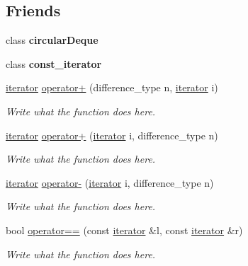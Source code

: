 \subsection*{Friends}
\begin{DoxyCompactItemize}
\item 
\hypertarget{classcircularDeque_1_1iterator_aa63d8b47e75b076d05ec6aa14e29109b}{class {\bfseries circular\+Deque}}\label{classcircularDeque_1_1iterator_aa63d8b47e75b076d05ec6aa14e29109b}

\item 
\hypertarget{classcircularDeque_1_1iterator_ac220ce1c155db1ac44146c12d178056f}{class {\bfseries const\+\_\+iterator}}\label{classcircularDeque_1_1iterator_ac220ce1c155db1ac44146c12d178056f}

\item 
\hyperlink{classcircularDeque_1_1iterator}{iterator} \hyperlink{classcircularDeque_1_1iterator_ac16e910c895e60a596b80b7c86fc1515}{operator+} (difference\+\_\+type n, \hyperlink{classcircularDeque_1_1iterator}{iterator} i)
\begin{DoxyCompactList}\small\item\em Write what the function does here. \end{DoxyCompactList}\item 
\hyperlink{classcircularDeque_1_1iterator}{iterator} \hyperlink{classcircularDeque_1_1iterator_ac75e470ef6da99b63e93e64a6564b50c}{operator+} (\hyperlink{classcircularDeque_1_1iterator}{iterator} i, difference\+\_\+type n)
\begin{DoxyCompactList}\small\item\em Write what the function does here. \end{DoxyCompactList}\item 
\hyperlink{classcircularDeque_1_1iterator}{iterator} \hyperlink{classcircularDeque_1_1iterator_a909c554e380a6de09d132abaf5868326}{operator-\/} (\hyperlink{classcircularDeque_1_1iterator}{iterator} i, difference\+\_\+type n)
\begin{DoxyCompactList}\small\item\em Write what the function does here. \end{DoxyCompactList}\item 
bool \hyperlink{classcircularDeque_1_1iterator_a507249f95531109aebe1ea4324c03c63}{operator==} (const \hyperlink{classcircularDeque_1_1iterator}{iterator} \&l, const \hyperlink{classcircularDeque_1_1iterator}{iterator} \&r)
\begin{DoxyCompactList}\small\item\em Write what the function does here. \end{DoxyCompactList}\item 

\end{DoxyCompactItemize}
